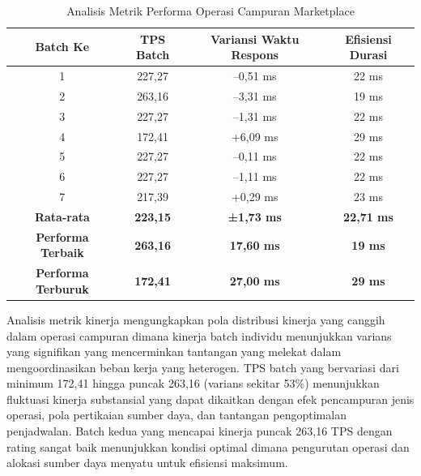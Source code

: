\begin{table}[h!]
  \centering
  \begin{tabular}{|c|c|c|c|}
    \hline
    \textbf{Batch Ke}          & \textbf{TPS Batch} & \textbf{Variansi Waktu Respons} & \textbf{Efisiensi Durasi} \\
    \hline
    1                          & 227,27             & –0,51 ms                        & 22 ms                     \\
    \hline
    2                          & 263,16             & –3,31 ms                        & 19 ms                     \\
    \hline
    3                          & 227,27             & –1,31 ms                        & 22 ms                     \\
    \hline
    4                          & 172,41             & +6,09 ms                        & 29 ms                     \\
    \hline
    5                          & 227,27             & –0,11 ms                        & 22 ms                     \\
    \hline
    6                          & 227,27             & –1,11 ms                        & 22 ms                     \\
    \hline
    7                          & 217,39             & +0,29 ms                        & 23 ms                     \\
    \hline
    \hline
    \textbf{Rata-rata}         & \textbf{223,15}    & \textbf{±1,73 ms}               & \textbf{22,71 ms}         \\
    \hline
    \textbf{Performa Terbaik}  & \textbf{263,16}    & \textbf{17,60 ms}               & \textbf{19 ms}            \\
    \hline
    \textbf{Performa Terburuk} & \textbf{172,41}    & \textbf{27,00 ms}               & \textbf{29 ms}            \\
    \hline
  \end{tabular}
  \caption{Analisis Metrik Performa Operasi Campuran Marketplace}
  \label{tab:mixed_operations_metrics}
\end{table}
Analisis metrik kinerja mengungkapkan pola distribusi kinerja yang canggih dalam operasi campuran dimana kinerja batch individu menunjukkan varians yang signifikan yang mencerminkan tantangan yang melekat dalam mengoordinasikan beban kerja yang heterogen. TPS batch yang bervariasi dari minimum 172,41 hingga puncak 263,16 (varians sekitar 53\%) menunjukkan fluktuasi kinerja substansial yang dapat dikaitkan dengan efek pencampuran jenis operasi, pola pertikaian sumber daya, dan tantangan pengoptimalan penjadwalan. Batch kedua yang mencapai kinerja puncak 263,16 TPS dengan rating sangat baik menunjukkan kondisi optimal dimana pengurutan operasi dan alokasi sumber daya menyatu untuk efisiensi maksimum.

